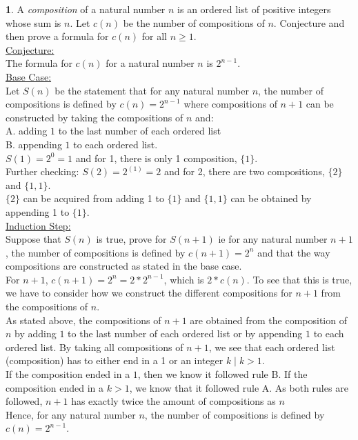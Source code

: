 \documentclass[12pt,a4paper]{article}
\theoremstyle{definition}
\newtheorem{problem}{}
\begin{document}
\begin{problem}
A \emph{composition} of a natural number $n$ is an ordered list of positive integers whose sum is $n$. Let $c(n)$ be the number of compositions of $n$. Conjecture and then prove a formula for $c(n)$ for all $n\geq 1$. \\

\underline{Conjecture:}\\
The formula for $c(n)$ for a natural number $n$ is $2^{n - 1}$. \\

\underline{Base Case:} \\
Let $S(n)$ be the statement that for any natural number $n$, the number of compositions is defined by $c(n) = 2^{n - 1}$ where compositions of $n + 1$ can be constructed by taking the compositions of $n$ and:\\
A. adding $1$ to the last number of each ordered list \\
B. appending $1$ to each ordered list. \\

$S(1) = 2^{0} = 1$ and for 1, there is only 1 composition, $\{1\}$. \\

Further checking: $S(2) = 2^(1) = 2$ and for 2, there are two compositions, $\{2\}$ and $\{1, 1\}$. \\
$\{2\}$ can be acquired from adding 1 to $\{1\}$ and $\{1, 1\}$ can be obtained by appending 1 to $\{1\}$.\\

\underline{Induction Step:} \\
Suppose that $S(n)$ is true, prove for $S(n + 1)$ ie for any natural number $n + 1$, the number of compositions is defined by $c(n + 1) = 2^n$ and that the way compositions are constructed as stated in the base case.\\

For $n + 1$, $c(n + 1) = 2^n = 2*2^{n - 1}$, which is $2*c(n)$. To see that this is true, we have to consider how we construct the different compositions for $n + 1$ from the compositions of $n$. \\

As stated above, the compositions of $n + 1$ are obtained from the composition of $n$ by adding $1$ to the last number of each ordered list or by appending $1$ to each ordered list. By taking all compositions of $n + 1$, we see that each ordered list (composition) has to either end in a 1 or an integer $k \mid k > 1$. \\

If the composition ended in a $1$, then we know it followed rule B. If the composition ended in a $k > 1$, we know that it followed rule A. As both rules are followed, $n + 1$ has exactly twice the amount of compositions as $n$ \\

Hence, for any natural number $n$, the number of compositions is defined by $c(n) = 2^{n - 1}$.

\end{problem}
\end{document}
